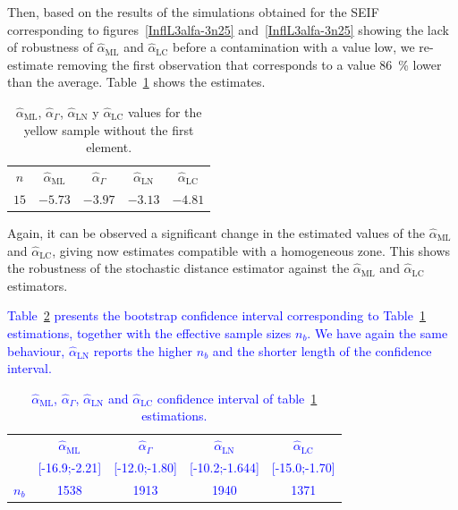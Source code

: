 \documentclass[twocolumn]{svjour3}
\begin{document}
	Then, based on the results of the simulations obtained for the SEIF corresponding to figures~\ref{InflL3alfa-3n25} and~\ref{InflL3alfa-3n25} showing the lack of robustness of $\widehat{\alpha}_{\text{{ML}}}$ and $\widehat{\alpha}_{\text{{LC}}}$ before a contamination with a value low, we re-estimate removing the first observation that corresponds to a value \SI{86}{\percent} lower than the average. 
	Table~\ref{SinPrimero} shows the estimates.
	
	\begin{table}[hbt]
		\centering
		\caption{$\widehat{\alpha}_{\text{{ML}}}$, $\widehat{\alpha}_{\Gamma}$, $\widehat{\alpha}_{\text{{LN}}}$ y $\widehat{\alpha}_{\text{{LC}}}$ values for the yellow sample without the first element.}\label{SinPrimero} 
		\begin{tabular}{c*4{c}}
			\toprule
			$n$    &  $\widehat{\alpha}_{\text{{ML}}}$    &  $\widehat{\alpha}_{\Gamma}$  &  $\widehat{\alpha}_{\text{{LN}}}$ &  $\widehat{\alpha}_{\text{{LC}}}$\\
			\cmidrule(lr){1-5}
			$15$  & $-5.73$   & $-3.97$    & $-3.13$    & $-4.81$\\
			\bottomrule
		\end{tabular}
	\end{table}
	
	Again, it can be observed a significant change in the estimated values of the $\widehat{\alpha}_{\text{{ML}}}$ and $\widehat{\alpha}_{\text{{LC}}}$, giving now estimates compatible with a homogeneous zone. This shows the robustness of the stochastic distance estimator against the $\widehat{\alpha}_{\text{{ML}}}$ and $\widehat{\alpha}_{\text{{LC}}}$ estimators.
	
	\textcolor{blue}{
	Table~\ref{ICYellowSinOutlier} presents the bootstrap confidence interval corresponding to Table~\ref{SinPrimero} estimations, together with the effective sample sizes $n_b$. We have again the same behaviour, $\widehat{\alpha}_{\text{{LN}}}$ reports the higher $n_b$ and the shorter length of the confidence interval. 
	\begin{table}[hbt]
		\addtolength{\tabcolsep}{-4pt}
		\centering
		\caption{ $\widehat{\alpha}_{\text{{ML}}}$, $\widehat{\alpha}_{\Gamma}$, $\widehat{\alpha}_{\text{{LN}}}$ and $\widehat{\alpha}_{\text{{LC}}}$ confidence interval of table~\ref{SinPrimero} estimations.}\label{ICYellowSinOutlier}
		\textcolor{blue}{
			\begin{tabular}{c*4{c}}
				\toprule
				& $\widehat{\alpha}_{\text{{ML}}}$    &  $\widehat{\alpha}_{\Gamma}$  &  $\widehat{\alpha}_{\text{{LN}}}$ &  $\widehat{\alpha}_{\text{{LC}}}$\\
				\cmidrule(lr){1-5}
				&[-16.9;-2.21] & [-12.0;-1.80] & [-10.2;-1.644] & [-15.0;-1.70]\\
				$n_{b}$       & 1538          & 1913           & 1940          &  1371 \\
				\bottomrule
			\end{tabular}
		}
	\end{table} 
}
\end{document}
